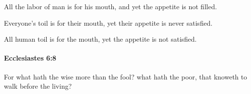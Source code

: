 			\begin{versebox}
					\item[BHS] 
					\item[LXX] 
					\item[ASV] All the labor of man is for his mouth, and yet the appetite is not filled.
					\item[NIV] Everyone’s toil is for their mouth, yet their appetite is never satisfied.
					\item[NRSV] All human toil is for the mouth, yet the appetite is not satisfied.
			\end{versebox}

		\paragraph{Ecclesiastes 6:8} %
			\label{ECCLESIASTES-6-8}

			For what hath the wise more than the fool? what hath the poor, that knoweth to walk before the living?

